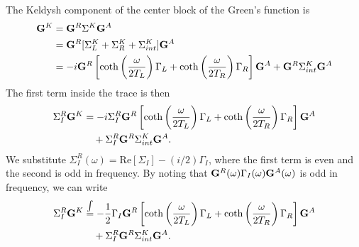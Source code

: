 The Keldysh component of the center block of the Green's function is
\begin{alignat}{2}
 \mathbf{G}^K &= \mathbf{G}^R \Sigma^K \mathbf{G}^A  \\
  &= \mathbf{G}^R [\Sigma_L^K + \Sigma_R^K + \Sigma_{int}^K ] \mathbf{G}^A \\
  &= -i \mathbf{G}^R \left[\coth\left(\frac{\omega}{2T_L}\right)\Gamma_L+\coth\left(\frac{\omega}{2T_R}\right)\Gamma_R \right]\mathbf{G}^A + \mathbf{G}^R \Sigma_{int}^K\mathbf{G}^A
\end{alignat}
The first term inside the trace is then
\begin{alignat}{2}
 \Sigma_I^R \mathbf{G}^K &= -i \Sigma_I^R\mathbf{G}^R \left[\coth\left(\frac{\omega}{2T_L}\right)\Gamma_L+\coth\left(\frac{\omega}{2T_R}\right)\Gamma_R \right]\mathbf{G}^A \notag \\
  &\quad + \Sigma_I^R\mathbf{G}^R \Sigma_{int}^K\mathbf{G}^A.
\end{alignat}
We substitute $\Sigma_I^R(\omega) =\textrm{Re}[\Sigma_I] - (i/2) \Gamma_I$, where the first term is even and the second is odd in frequency. By noting that $\mathbf{G}^R(\omega)\Gamma_I(\omega) \mathbf{G}^A(\omega)$ is odd in frequency, we can write
\begin{alignat}{2}
 \Sigma_I^R \mathbf{G}^K & \hspace{-0mm}\stackrel{\int} {=} - \frac{1}{2} \Gamma_I \mathbf{G}^R \left[\coth\left(\frac{\omega}{2T_L}\right)\Gamma_L+\coth\left(\frac{\omega}{2T_R}\right)\Gamma_R \right]\mathbf{G}^A \notag \\
  &\quad + \Sigma_I^R\mathbf{G}^R \Sigma_{int}^K\mathbf{G}^A.
\end{alignat}

